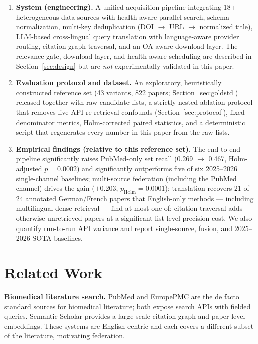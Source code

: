 \documentclass[sigconf,screen]{acmart}
\begin{document}
\begin{enumerate}
\item \textbf{System (engineering).} A unified acquisition pipeline
integrating 18+ heterogeneous data sources with health-aware parallel
search, schema normalization, multi-key deduplication
(DOI $\rightarrow$ URL $\rightarrow$ normalized title), LLM-based
cross-lingual query translation with language-aware provider routing,
citation graph traversal, and an OA-aware download layer. The relevance
gate, download layer, and health-aware scheduling are described in
Section~\ref{sec:design} but are \emph{not} experimentally validated in
this paper.
\item \textbf{Evaluation protocol and dataset.} An exploratory,
heuristically constructed reference set (43 variants, 822 papers;
Section~\ref{sec:goldstd}) released together with raw candidate lists, a
strictly nested ablation protocol that removes live-API re-retrieval
confounds (Section~\ref{sec:protocol}), fixed-denominator metrics,
Holm-corrected paired statistics, and a deterministic script that
regenerates every number in this paper from the raw lists.
\item \textbf{Empirical findings (relative to this reference set).} The
end-to-end pipeline significantly raises PubMed-only set recall
(0.269 $\rightarrow$ 0.467, Holm-adjusted $p{=}0.0002$) and significantly
outperforms five of six 2025--2026 single-channel baselines; multi-source
federation (including the PubMed channel) drives the gain
($+0.203$, $p_{\text{Holm}}{=}0.0001$); translation recovers 21 of 24
annotated German/French papers that English-only methods --- including
multilingual dense retrieval --- find at most one of; citation traversal
adds otherwise-unretrieved papers at a significant list-level precision
cost. We also quantify run-to-run API variance and report single-source,
fusion, and 2025--2026 SOTA baselines.
\end{enumerate}

\section{Related Work}
\label{sec:related}

\textbf{Biomedical literature search.} PubMed \cite{pubmed} and EuropePMC
\cite{europepmc} are the de facto standard sources for biomedical
literature; both expose search APIs with fielded queries. Semantic Scholar
\cite{kinney2023semantic} provides a large-scale citation graph and
paper-level embeddings. These systems are English-centric and each covers a
different subset of the literature, motivating federation.
\end{document}
